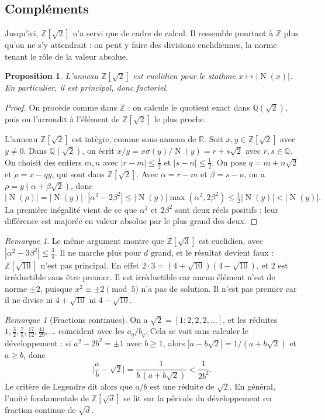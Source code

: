 \documentclass[11pt,a4paper]{article}
\theoremstyle{plain}
\newtheorem{proposition}[theoreme]{Proposition}
\theoremstyle{definition}
\theoremstyle{remark}
\newtheorem{remarque}[theoreme]{Remarque}
\newcommand{\Z}{\mathbb{Z}}
\newcommand{\Q}{\mathbb{Q}}
\newcommand{\R}{\mathbb{R}}
\DeclareMathOperator{\Nm}{N}
\begin{document}
\subsection{Compléments}

Jusqu'ici, $\Z[\sqrt2]$ n'a servi que de cadre de calcul. Il ressemble pourtant à $\Z$ plus qu'on ne s'y attendrait : on peut y faire des divisions euclidiennes, la norme tenant le rôle de la valeur absolue.

\begin{proposition}\label{prop:euclide}
L'anneau $\Z[\sqrt2]$ est euclidien pour le stathme $x\mapsto|\Nm(x)|$. En particulier, il est principal, donc factoriel.
\end{proposition}

\begin{proof}
On procède comme dans $\Z$ : on calcule le quotient exact dans $\Q(\sqrt2)$, puis on l'arrondit à l'élément de $\Z[\sqrt2]$ le plus proche.

L'anneau $\Z[\sqrt2]$ est intègre, comme sous-anneau de $\R$. Soit $x,y\in\Z[\sqrt2]$ avec $y\neq0$. Dans $\Q(\sqrt2)$, on écrit $x/y=x\sigma(y)/\Nm(y)=r+s\sqrt2$ avec $r,s\in\Q$. On choisit des entiers $m,n$ avec $|r-m|\leq\frac12$ et $|s-n|\leq\frac12$. On pose $q=m+n\sqrt2$ et $\rho=x-qy$, qui sont dans $\Z[\sqrt2]$. Avec $\alpha=r-m$ et $\beta=s-n$, on a $\rho=y(\alpha+\beta\sqrt2)$, donc
\[
  |\Nm(\rho)|=|\Nm(y)|\cdot|\alpha^2-2\beta^2|\leq|\Nm(y)|\max(\alpha^2,2\beta^2)\leq\tfrac12|\Nm(y)|<|\Nm(y)|.
\]
La première inégalité vient de ce que $\alpha^2$ et $2\beta^2$ sont deux réels positifs : leur différence est majorée en valeur absolue par le plus grand des deux.
\end{proof}

\begin{remarque}
Le même argument montre que $\Z[\sqrt3]$ est euclidien, avec $|\alpha^2-3\beta^2|\leq\frac34$. Il ne marche plus pour $d$ grand, et le résultat devient faux : $\Z[\sqrt{10}]$ n'est pas principal. En effet $2\cdot3=(4+\sqrt{10})(4-\sqrt{10})$, et $2$ est irréductible sans être premier. Il est irréductible car aucun élément n'est de norme $\pm2$, puisque $x^2\equiv\pm2\pmod5$ n'a pas de solution. Il n'est pas premier car il ne divise ni $4+\sqrt{10}$ ni $4-\sqrt{10}$.
\end{remarque}

\begin{remarque}[Fractions continues]
On a $\sqrt2=[1;2,2,2,\dots]$, et les réduites $1,\frac32,\frac75,\frac{17}{12},\frac{41}{29},\dots$ coïncident avec les $a_q/b_q$. Cela se voit sans calculer le développement : si $a^2-2b^2=\pm1$ avec $b\geq1$, alors $|a-b\sqrt2|=1/(a+b\sqrt2)$ et $a\geq b$, donc
\[
  \Big|\frac ab-\sqrt2\Big|=\frac{1}{b\,(a+b\sqrt2)}<\frac{1}{2b^2}.
\]
Le critère de Legendre dit alors que $a/b$ est une réduite de $\sqrt2$. En général, l'unité fondamentale de $\Z[\sqrt d]$ se lit sur la période du développement en fraction continue de $\sqrt d$.
\end{remarque}
\end{document}
